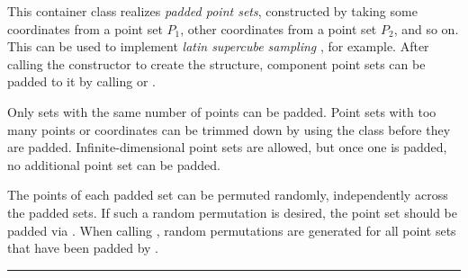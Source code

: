 
This container class realizes \emph{padded point sets}, constructed
by taking some coordinates from a point set $P_1$, other coordinates
from a point set $P_2$, and so on.
This can be used to implement \emph{latin supercube sampling}
\cite{vOWE98a}, for example. 
After calling the constructor to create the structure, component
point sets can be padded to it by calling  or
.

Only sets with the same number of points can be padded.
Point sets with too many points or coordinates can be trimmed down
by using the class  before they are padded.
Infinite-dimensional point sets are allowed, but once one is padded,
no additional point set can be padded.

The points of each padded set can be permuted randomly,
independently across the padded sets.
If such a random permutation is desired, the point set should be
padded via .
When calling , random permutations are generated for
all point sets that have been padded by .

\bigskip\hrule\bigskip

